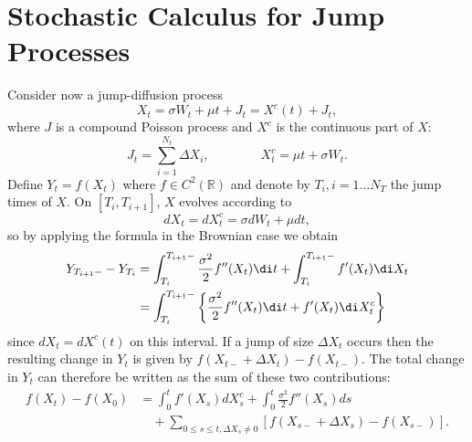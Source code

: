 \section{Stochastic Calculus for Jump Processes}

Consider now a jump-diffusion process
\begin{equation} \label{eq:JumpDiffusionProcess}
	X_t = \sigma W_t + \mu t + J_t = X^c(t) + J_t,
\end{equation}
where \(J\) is a compound Poisson process and \(X^c\) is the continuous part of \(X\):
\begin{equation} \label{eq:ComponentDefinitions}
	J_t = \sum_{i=1}^{N_t} \Delta X_i, \qquad\qquad X^c_t = \mu t + \sigma W_t.
\end{equation}
Define \(Y_t = f(X_t)\) where \(f \in C^2(\mathbb{R})\) and denote by \(T_i, i = 1 \dots N_T\) the jump times of \(X\). On \([T_i, T_{i+1}]\), \(X\) evolves according to
\begin{equation} \label{eq:EvolutionBetweenJumps}
	dX_t = dX^c_t = \sigma dW_t + \mu dt,
\end{equation}
so by applying the \Ito{} formula in the Brownian case we obtain
\begin{align} \label{eq:ItoIntegration}
	Y_{T_{i+1}-} - Y_{T_i} & = \int_{T_i}^{T_{i+1}-} \frac{\sigma^2}{2} f''(X_t) \di t + \int_{T_i}^{T_{i+1}-} f'(X_t) \di X_t \nonumber \\
	                       & = \int_{T_i}^{T_{i+1}-} \left\{ \frac{\sigma^2}{2} f''(X_t) \di t + f'(X_t) \di X^c_t \right\}
\end{align}
since \(dX_t = dX^c(t)\) on this interval. If a jump of size \(\Delta X_t\) occurs then the resulting change in \(Y_t\) is given by \(f(X_{t-} + \Delta X_t) - f(X_{t-})\). The total change in \(Y_t\) can therefore be written as the sum of these two contributions:
\begin{equation} \label{eq:FinalItoFormula}
	\begin{split}
		f(X_t) - f(X_0) & = \int_0^t f'(X_s) dX^c_s + \int_0^t \frac{\sigma^2}{2} f''(X_s) ds                   \\
		                & \quad + \sum_{0 \le s \le t, \Delta X_s \neq 0} [f(X_{s-} + \Delta X_s) - f(X_{s-})].
	\end{split}
\end{equation}

